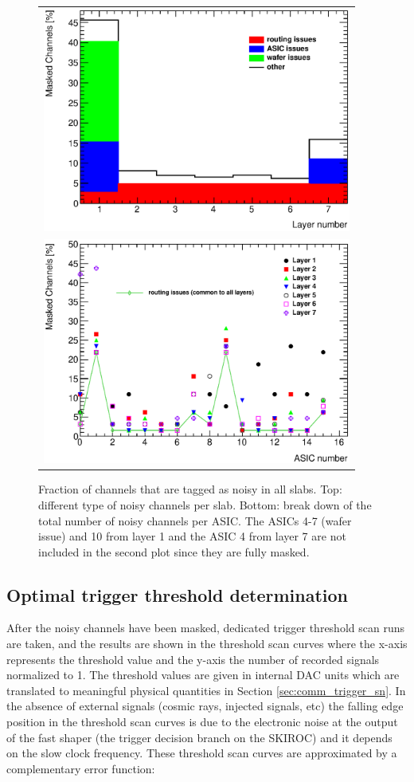 \documentclass[a4paper,11pt]{article}
\begin{document}
\begin{figure}[!t]
  \centering
  \begin{tabular}{l}
  \includegraphics[width=4in]{../figs/commissioning/masked_layer.eps} \\
  \includegraphics[width=4in]{../figs/commissioning/masked_chip.eps}
  \end{tabular}
\caption{Fraction of channels that are tagged as noisy in all slabs. 
Top: different type of noisy channels per slab. 
Bottom: break down of the total number of noisy channels per ASIC. 
The ASICs 4-7 (wafer issue) and 10 from layer 1 and the ASIC 4 from layer 7 are not included
in the second plot since they are fully masked.}
\label{noisycells}
\end{figure}


\subsection{Optimal trigger threshold determination}
\label{sec:comm_trigger}

After the noisy channels have been masked, dedicated trigger threshold
scan runs are taken, and the results are shown in the threshold scan curves where the
x-axis represents the threshold value and the y-axis
the number of recorded signals normalized to 1. The threshold values are given in internal DAC units
which are translated to meaningful physical quantities in Section \ref{sec:comm_trigger_sn}.
In the absence of external signals (cosmic rays, injected signals, etc) 
the falling edge position in the threshold scan curves
is due to the electronic noise
at the output of the fast shaper (the trigger decision branch on the SKIROC)
and it depends on the slow clock frequency.
These threshold scan curves are approximated by a complementary error function:
\end{document}
